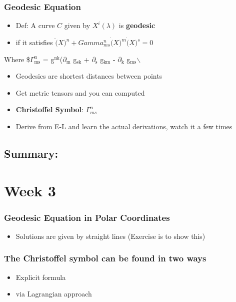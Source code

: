 \documentclass[11pt]{article}
\begin{document}
\subsubsection{Geodesic Equation}
\label{sec:org7b14002}
\begin{itemize}
\item Def: A curve \(C\) given by \(X^i(\lambda)\) is \textbf{geodesic}
\item if it satisfies \(\ddot(X)^n+Gamma^{n}_{ms}\dot(X)^m\dot(X)^s = 0\)
\end{itemize}
Where \$\(\Gamma^{\text{n}}_{\text{ms}}\) = \textonehalf{} g\(^{\text{nk}}\)\eft(\(\partial_{\text{m}}\) g\(_{\text{sk}}\) + \(\partial_{\text{s}}\) g\(_{\text{km}}\) - \(\partial_{\text{k}}\) g\(_{\text{ms}}\)$\backslash$
\begin{itemize}
\item Geodesics are shortest distances between points
\item Get metric tensors and you can computed
\item \textbf{Christoffel Symbol}: \(\Gamma^n_{ms}\)
\item Derive from E-L and learn the actual derivations, watch it a few times
\end{itemize}
\subsection{Summary:}
\label{sec:orga388aff}
\section{Week 3}
\label{sec:orga162787}
\subsubsection{Geodesic Equation in Polar Coordinates}
\label{sec:org6299e36}
\begin{itemize}
\item Solutions are given by straight lines (Exercise is to show this)
\end{itemize}
\subsubsection{The Christoffel symbol can be found in two ways}
\label{sec:orgadcde4e}
\begin{itemize}
\item Explicit formula
\item via Lagrangian approach
\end{itemize}
\end{document}
